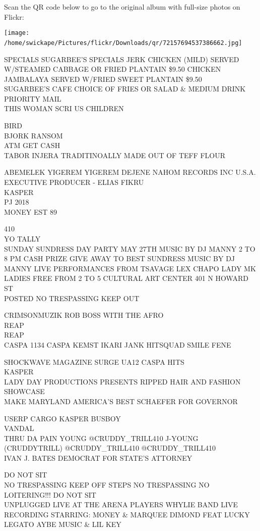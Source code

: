 \documentclass[10pt,letterpaper]{article}
\begin{document}
Scan the QR code below to go to the original album with full-size photos on Flickr:

\texttt{[image: /home/swickape/Pictures/flickr/Downloads/qr/72157694537386662.jpg]}
\

SPECIALS SUGARBEE'S SPECIALS JERK CHICKEN (MILD) SERVED W/STEAMED CABBAGE OR FRIED PLANTAIN \$9.50 CHICKEN JAMBALAYA SERVED W/FRIED SWEET PLANTAIN \$9.50\\
SUGARBEE'S CAFE CHOICE OF FRIES OR SALAD \& MEDIUM DRINK\\
PRIORITY MAIL\\
THIS WOMAN SCRI US CHILDREN

BIRD\\
BJORK RANSOM\\
ATM GET CASH\\
TABOR INJERA TRADITINOALLY MADE OUT OF TEFF FLOUR

ABEMELEK YIGEREM YIGEREM DEJENE NAHOM RECORDS INC U.S.A. EXECUTIVE PRODUCER {-} ELIAS FIKRU\\
KASPER\\
PJ 2018\\
MONEY EST 89

410\\
YO TALLY\\
SUNDAY SUNDRESS DAY PARTY MAY 27TH MUSIC BY DJ MANNY 2 TO 8 PM CASH PRIZE GIVE AWAY TO BEST SUNDRESS MUSIC BY DJ MANNY LIVE PERFORMANCES FROM TSAVAGE LEX CHAPO LADY MK LADIES FREE FROM 2 TO 5 CULTURAL ART CENTER 401 N HOWARD ST\\
POSTED NO TRESPASSING KEEP OUT

CRIMSONMUZIK ROB BOSS WITH THE AFRO\\
REAP\\
REAP\\
CASPA 1134 CASPA KEMST IKARI JANK HITSQUAD SMILE FENE

SHOCKWAVE MAGAZINE SURGE UA12 CASPA HITS\\
KASPER\\
LADY DAY PRODUCTIONS PRESENTS RIPPED HAIR AND FASHION SHOWCASE\\
MAKE MARYLAND AMERICA'S BEST SCHAEFER FOR GOVERNOR

USERP CARGO KASPER BUSBOY\\
VANDAL\\
THRU DA PAIN YOUNG @CRUDDY\_TRILL410 J{-}YOUNG (CRUDDYTRILL) @CRUDDY\_TRILL410 @CRUDDY\_TRILL410\\
IVAN J. BATES DEMOCRAT FOR STATE'S ATTORNEY

DO NOT SIT\\
NO TRESPASSING KEEP OFF STEPS NO TRESPASSING NO LOITERING!!! DO NOT SIT\\
UNPLUGGED LIVE AT THE ARENA PLAYERS WHYLIE BAND LIVE RECORDING STARRING: MONEY \& MARQUEE DIMOND FEAT LUCKY LEGATO AYBE MUSIC \& LIL KEY
\end{document}
